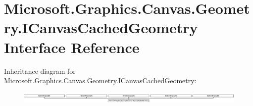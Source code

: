 \hypertarget{interface_microsoft_1_1_graphics_1_1_canvas_1_1_geometry_1_1_i_canvas_cached_geometry}{}\section{Microsoft.\+Graphics.\+Canvas.\+Geometry.\+I\+Canvas\+Cached\+Geometry Interface Reference}
\label{interface_microsoft_1_1_graphics_1_1_canvas_1_1_geometry_1_1_i_canvas_cached_geometry}
Inheritance diagram for Microsoft.\+Graphics.\+Canvas.\+Geometry.\+I\+Canvas\+Cached\+Geometry\+:\begin{figure}[H]
\begin{center}
\leavevmode
\includegraphics[height=0.587927cm]{interface_microsoft_1_1_graphics_1_1_canvas_1_1_geometry_1_1_i_canvas_cached_geometry}
\end{center}
\end{figure}
